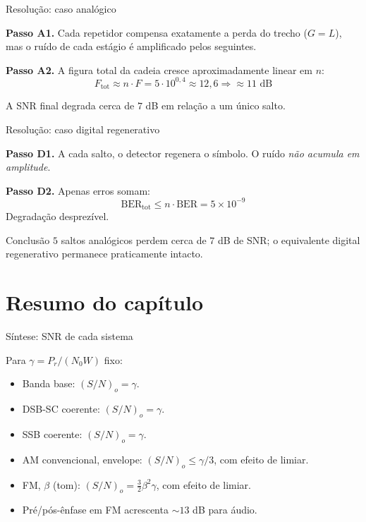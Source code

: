 
\begin{frame}{Resolução: caso analógico}

\textbf{Passo A1.} Cada repetidor compensa exatamente a perda do trecho ($G = L$), mas o ruído de cada estágio é amplificado pelos seguintes.

\textbf{Passo A2.} A figura total da cadeia cresce aproximadamente linear em $n$:
\[
F_{\text{tot}} \approx n \cdot F = 5 \cdot 10^{0{,}4} \approx 12{,}6 \Rightarrow \approx 11 \text{ dB}
\]

A SNR final degrada cerca de $7$ dB em relação a um único salto.

\end{frame}


\begin{frame}{Resolução: caso digital regenerativo}

\textbf{Passo D1.} A cada salto, o detector regenera o símbolo. O ruído \emph{não acumula em amplitude}.

\textbf{Passo D2.} Apenas erros somam:
\[
\text{BER}_{\text{tot}} \le n \cdot \text{BER} = 5 \times 10^{-9}
\]
Degradação desprezível.

\begin{block}{Conclusão}
$5$ saltos analógicos perdem cerca de $7$ dB de SNR; o equivalente digital regenerativo permanece praticamente intacto.
\end{block}

\end{frame}


\section{Resumo do capítulo}

\begin{frame}{Síntese: SNR de cada sistema}

Para $\gamma = P_r/(N_0 W)$ fixo:

\begin{itemize}
\item Banda base: $(S/N)_o = \gamma$.
\item DSB-SC coerente: $(S/N)_o = \gamma$.
\item SSB coerente: $(S/N)_o = \gamma$.
\item AM convencional, envelope: $(S/N)_o \le \gamma/3$, com efeito de limiar.
\item FM, $\beta$ (tom): $(S/N)_o = \tfrac{3}{2}\beta^2 \gamma$, com efeito de limiar.
\item Pré/pós-ênfase em FM acrescenta $\sim 13$ dB para áudio.
\end{itemize}

\end{frame}

